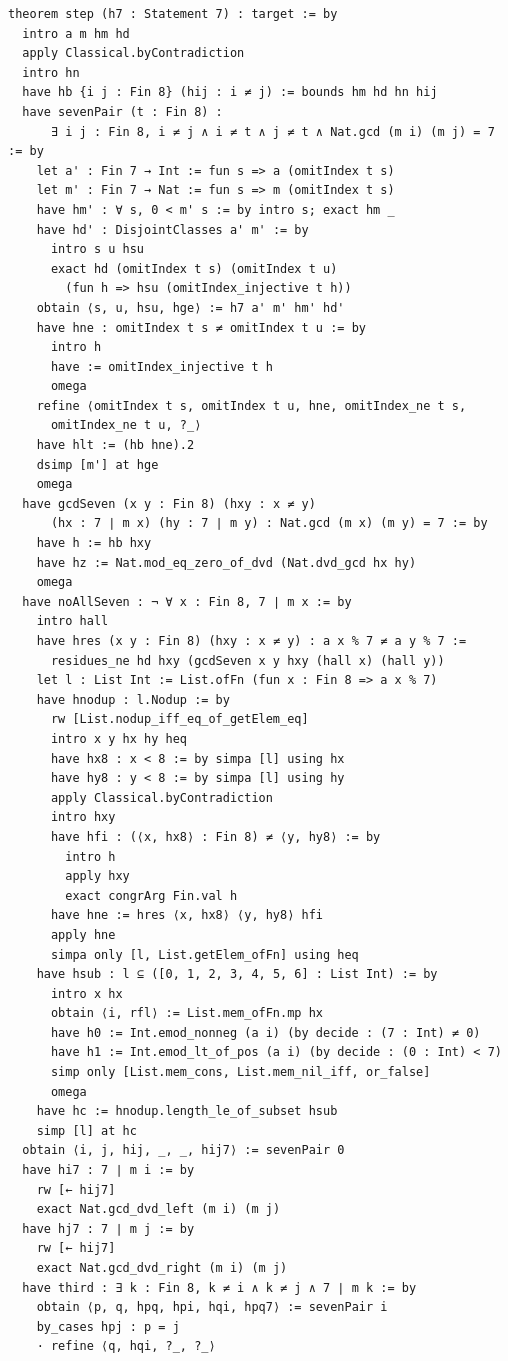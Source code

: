 \documentclass[11pt,a4paper]{article}
\begin{document}
\begin{Verbatim}[breaklines,breakanywhere,fontsize=\footnotesize]
theorem step (h7 : Statement 7) : target := by
  intro a m hm hd
  apply Classical.byContradiction
  intro hn
  have hb {i j : Fin 8} (hij : i ≠ j) := bounds hm hd hn hij
  have sevenPair (t : Fin 8) :
      ∃ i j : Fin 8, i ≠ j ∧ i ≠ t ∧ j ≠ t ∧ Nat.gcd (m i) (m j) = 7 := by
    let a' : Fin 7 → Int := fun s => a (omitIndex t s)
    let m' : Fin 7 → Nat := fun s => m (omitIndex t s)
    have hm' : ∀ s, 0 < m' s := by intro s; exact hm _
    have hd' : DisjointClasses a' m' := by
      intro s u hsu
      exact hd (omitIndex t s) (omitIndex t u)
        (fun h => hsu (omitIndex_injective t h))
    obtain ⟨s, u, hsu, hge⟩ := h7 a' m' hm' hd'
    have hne : omitIndex t s ≠ omitIndex t u := by
      intro h
      have := omitIndex_injective t h
      omega
    refine ⟨omitIndex t s, omitIndex t u, hne, omitIndex_ne t s,
      omitIndex_ne t u, ?_⟩
    have hlt := (hb hne).2
    dsimp [m'] at hge
    omega
  have gcdSeven (x y : Fin 8) (hxy : x ≠ y)
      (hx : 7 ∣ m x) (hy : 7 ∣ m y) : Nat.gcd (m x) (m y) = 7 := by
    have h := hb hxy
    have hz := Nat.mod_eq_zero_of_dvd (Nat.dvd_gcd hx hy)
    omega
  have noAllSeven : ¬ ∀ x : Fin 8, 7 ∣ m x := by
    intro hall
    have hres (x y : Fin 8) (hxy : x ≠ y) : a x % 7 ≠ a y % 7 :=
      residues_ne hd hxy (gcdSeven x y hxy (hall x) (hall y))
    let l : List Int := List.ofFn (fun x : Fin 8 => a x % 7)
    have hnodup : l.Nodup := by
      rw [List.nodup_iff_eq_of_getElem_eq]
      intro x y hx hy heq
      have hx8 : x < 8 := by simpa [l] using hx
      have hy8 : y < 8 := by simpa [l] using hy
      apply Classical.byContradiction
      intro hxy
      have hfi : (⟨x, hx8⟩ : Fin 8) ≠ ⟨y, hy8⟩ := by
        intro h
        apply hxy
        exact congrArg Fin.val h
      have hne := hres ⟨x, hx8⟩ ⟨y, hy8⟩ hfi
      apply hne
      simpa only [l, List.getElem_ofFn] using heq
    have hsub : l ⊆ ([0, 1, 2, 3, 4, 5, 6] : List Int) := by
      intro x hx
      obtain ⟨i, rfl⟩ := List.mem_ofFn.mp hx
      have h0 := Int.emod_nonneg (a i) (by decide : (7 : Int) ≠ 0)
      have h1 := Int.emod_lt_of_pos (a i) (by decide : (0 : Int) < 7)
      simp only [List.mem_cons, List.mem_nil_iff, or_false]
      omega
    have hc := hnodup.length_le_of_subset hsub
    simp [l] at hc
  obtain ⟨i, j, hij, _, _, hij7⟩ := sevenPair 0
  have hi7 : 7 ∣ m i := by
    rw [← hij7]
    exact Nat.gcd_dvd_left (m i) (m j)
  have hj7 : 7 ∣ m j := by
    rw [← hij7]
    exact Nat.gcd_dvd_right (m i) (m j)
  have third : ∃ k : Fin 8, k ≠ i ∧ k ≠ j ∧ 7 ∣ m k := by
    obtain ⟨p, q, hpq, hpi, hqi, hpq7⟩ := sevenPair i
    by_cases hpj : p = j
    · refine ⟨q, hqi, ?_, ?_⟩

\end{Verbatim}
\end{document}
